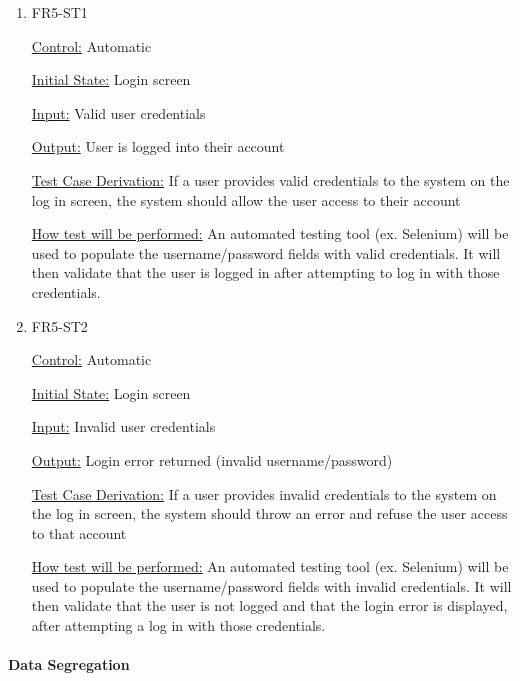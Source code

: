 \documentclass[12pt, titlepage]{article}
\begin{document}
\begin{enumerate}

\item{FR5-ST1\\}

\underline{Control:} Automatic

\underline{Initial State:} Login screen

\underline{Input:} Valid user credentials

\underline{Output:} User is logged into their account

\underline{Test Case Derivation:} If a user provides valid credentials to the system on the log in screen, the system should allow the user access to their account

\underline{How test will be performed:} An automated testing tool (ex. Selenium) will be used to populate the username/password fields with valid credentials. It will then validate that the user is logged in after attempting to log in with those credentials.
					
\item{FR5-ST2\\}

\underline{Control:} Automatic

\underline{Initial State:} Login screen

\underline{Input:} Invalid user credentials

\underline{Output:} Login error returned (invalid username/password)

\underline{Test Case Derivation:} If a user provides invalid credentials to the system on the log in screen, the system should throw an error and refuse the user access to that account

\underline{How test will be performed:} An automated testing tool (ex. Selenium) will be used to populate the username/password fields with invalid credentials. It will then validate that the user is not logged and that the login error is displayed, after attempting a log in with those credentials.

\end{enumerate}

\paragraph{Data Segregation}
\end{document}
